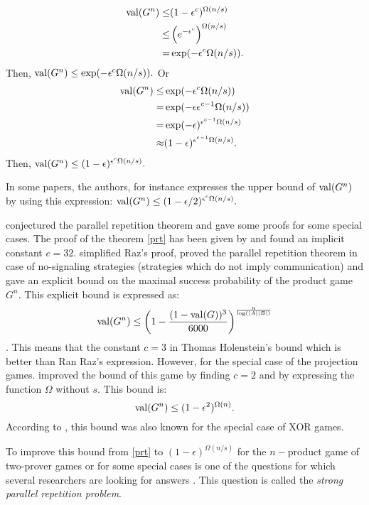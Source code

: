 \begin{align*}
\mathrm{val} (G^n) \leq & (1-\epsilon^c)^{\Omega(n/s)} \\ \leq &  \left(e^{-\epsilon^c}\right)^{\Omega(n/s)} \\ = & \exp (-\epsilon^c \Omega(n/s)).
\end{align*}
 Then, $\mathrm{val} (G^n) \leq \exp (-\epsilon^c \Omega(n/s)).$
Or 
\begin{align*}
\mathrm{val} (G^n) \leq & \exp (-\epsilon^c \Omega(n/s))  \\ = & \exp (-\epsilon \epsilon^{c-1} \Omega(n/s)) \\= & \exp (-\epsilon)^{\epsilon^{c-1} \Omega(n/s)} \\ \approx &  (1-\epsilon)^{\epsilon^{c-1} \Omega(n/s)}.
\end{align*} 
Then, $\mathrm{val} (G^n) \leq (1-\epsilon)^{\epsilon^{c} \Omega(n/s)}.$

In some papers, the authors, for instance \cite{rao2011parallel} expresses the upper bound of $\mathrm{val} (G^n)$ by using this expression: $\mathrm{val} (G^n) \leq (1-{\epsilon}/{2})^{  \epsilon^{c} \Omega(n/s)}.$

\cite{feige1992two} conjectured the parallel repetition theorem and gave some proofs for some special cases. The proof of the theorem \eqref{prt}  has been given by \cite{raz1998parallel} and found an implicit constant   $c=32$.  \cite{holenstein2007parallel} simplified Raz's proof, proved the parallel repetition theorem in case of no-signaling strategies (strategies which do
not imply communication) and gave an explicit bound on the maximal success probability of the product game $G^n.$ This explicit bound is expressed as:
$$\mathrm{val} (G^n) \leq \left(1-\frac{(1-\mathrm{val} (G))^3}{6000} \right)^{\frac{n}{\log (|A||B|)}}$$.
This means that the constant $c=3$ in Thomas Holenstein's bound which is better than Ran Raz's expression. However, for the special case of the projection games. 
\cite{rao2011parallel} improved the bound of this game by finding $c=2$ and by expressing the function $\Omega$ without $s.$ This bound is: $$\mathrm{val} (G^n) \leq (1-\epsilon^2)^{\Omega(n)}.$$ According to \cite{raz2010parallel}, this bound was also known for the special case of XOR games.

To improve this bound from \eqref{prt} to $(1-\epsilon)^{\Omega(n/s)}$ for the $n-$product game of two-prover games or for some special cases  is one of the questions for which several researchers are looking for answers \citep{raz2010parallel}.  This question is called the \textit{strong parallel repetition problem}.

